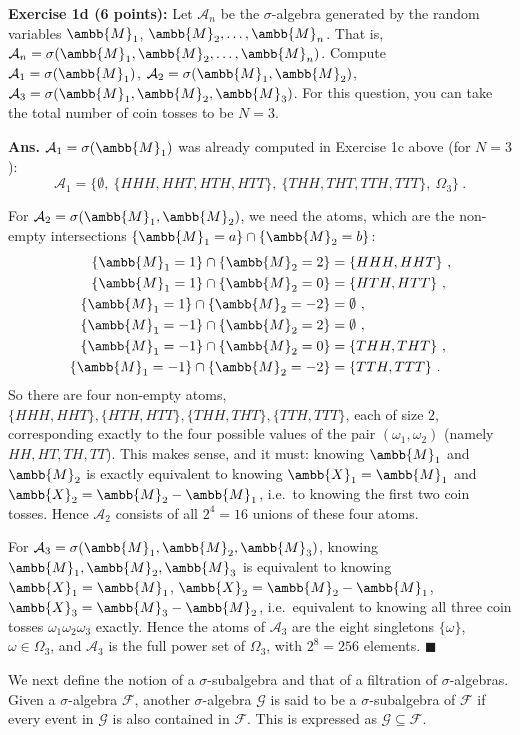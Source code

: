 \documentclass[12pt]{article} %
\newcommand{\mX}{\ambb{X}}
\newcommand{\mM}{\ambb{M}}
\newcommand{\cA}{\mathcal{A}}
\newcommand{\cF}{\mathcal{F}}
\newcommand{\Ans}{\textbf{Ans. }}
\begin{document}
\textbf{Exercise 1d (6 points):} Let $\cA_n$ be the $\sigma$-algebra
generated by the random variables $\mM_1$, $\mM_2, \ldots, \mM_n$. That
is, $\cA_n = \sigma(\mM_1, \mM_2, \ldots, \mM_n)$. Compute
$\cA_1 = \sigma(\mM_1)$, $\cA_2 = \sigma(\mM_1,\mM_2)$,
$\cA_3 = \sigma(\mM_1,\mM_2,\mM_3)$. For this question, you can take
the total number of coin tosses to be $N=3$.

\Ans $\cA_1 = \sigma(\mM_1)$ was already computed in Exercise 1c
above (for $N=3$):
\begin{equation}
  \cA_1 = \{\emptyset,\ \{HHH,HHT,HTH,HTT\},\ \{THH,THT,TTH,TTT\},\ \Omega_3\}\ .
\end{equation}

For $\cA_2 = \sigma(\mM_1,\mM_2)$, we need the atoms, which are the
non-empty intersections $\{\mM_1=a\}\cap\{\mM_2=b\}$:
\begin{align}
  \{\mM_1=1\}\cap\{\mM_2=2\} &= \{HHH,HHT\}\ ,\\
  \{\mM_1=1\}\cap\{\mM_2=0\} &= \{HTH,HTT\}\ ,\\
  \{\mM_1=1\}\cap\{\mM_2=-2\} &= \emptyset\ ,\\
  \{\mM_1=-1\}\cap\{\mM_2=2\} &= \emptyset\ ,\\
  \{\mM_1=-1\}\cap\{\mM_2=0\} &= \{THH,THT\}\ ,\\
  \{\mM_1=-1\}\cap\{\mM_2=-2\} &= \{TTH,TTT\}\ .
\end{align}
So there are four non-empty atoms,
$\{HHH,HHT\},\{HTH,HTT\},\{THH,THT\},\{TTH,TTT\}$, each of size $2$,
corresponding exactly to the four possible values of the pair
$(\omega_1,\omega_2)$ (namely $HH,HT,TH,TT$). This makes sense, and it must:
knowing $\mM_1$ and $\mM_2$ is exactly equivalent to knowing
$\mX_1 = \mM_1$ and $\mX_2 = \mM_2 - \mM_1$, i.e.\ to knowing the first
two coin tosses. Hence $\cA_2$ consists of all $2^4=16$ unions of
these four atoms.

For $\cA_3 = \sigma(\mM_1,\mM_2,\mM_3)$, knowing $\mM_1,\mM_2,\mM_3$ is
equivalent to knowing $\mX_1=\mM_1$, $\mX_2 = \mM_2-\mM_1$,
$\mX_3=\mM_3-\mM_2$, i.e.\ equivalent to knowing all three coin
tosses $\omega_1\omega_2\omega_3$ exactly. Hence the atoms of $\cA_3$
are the eight singletons $\{\omega\}$, $\omega \in \Omega_3$, and
$\cA_3$ is the full power set of $\Omega_3$, with $2^8 = 256$ elements.
\hfill$\blacksquare$

We next define the notion of a $\sigma$-subalgebra and that of a
filtration of $\sigma$-algebras. Given a $\sigma$-algebra $\cF$,
another $\sigma$-algebra $\mathcal G$ is said to be a
$\sigma$-subalgebra of $\cF$ if every event in $\mathcal G$ is also
contained in $\cF$. This is expressed as $\mathcal G \subseteq \cF$.
\end{document}
